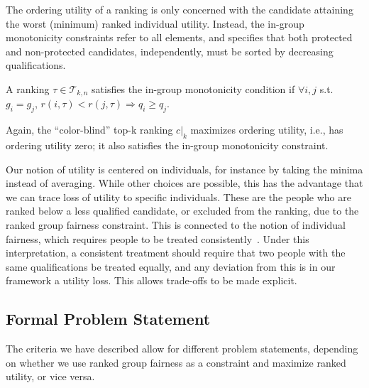 \noindent The ordering utility of a ranking is only concerned with the candidate attaining the worst (minimum) ranked individual utility. Instead, the in-group monotonicity constraints refer to all elements, and specifies that both protected and non-protected candidates, independently, must be sorted by decreasing qualifications.

\begin{definition}
	\label{def:inGroupMonotonicity}
	A ranking $\tau \in {\mathcal T}_{k,n}$ satisfies the in-group monotonicity condition if $\forall i,j$ s.t. $g_i = g_j$, $r(i,\tau) < r(j,\tau) \Rightarrow q_i \ge q_j$.
\end{definition}

\noindent Again, the ``color-blind'' top-k ranking $c|_k$ maximizes ordering utility, i.e., has ordering utility zero; it also satisfies the in-group monotonicity constraint.

\label{concept:our-utility-individual-fairness}
%
Our notion of utility is centered on individuals, for instance by taking the minima instead of averaging.
%
While other choices are possible, this has the advantage that we can trace loss of utility to specific individuals. These are the people who are ranked below a less qualified candidate, or excluded from the ranking, due to the ranked group fairness constraint.
%
This is connected to the notion of individual fairness, which requires people to be treated consistently~\cite{Dwork2012}. Under this interpretation, a consistent treatment should require that two people with the same qualifications be treated equally, and any deviation from this is in our framework a utility loss. This allows trade-offs to be made explicit.

\subsection{Formal Problem Statement}
\label{subsec:problem-statement}
The criteria we have described allow for different problem statements, depending on whether we use ranked group fairness as a constraint and maximize ranked utility, or vice versa.

